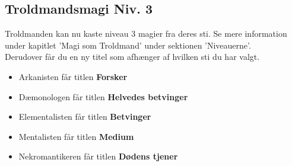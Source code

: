\subsection*{Troldmandsmagi Niv. 3}
Troldmanden kan nu kaste niveau 3 magier fra deres sti. Se mere information under kapitlet 'Magi som Troldmand' under sektionen 'Niveauerne'. \\
Derudover får du en ny titel som afhænger af hvilken sti du har valgt.\\
\begin{itemize}
    \item Arkanisten får titlen \textbf{Forsker}
    \item Dæmonologen får titlen \textbf{Helvedes betvinger}
    \item Elementalisten får titlen \textbf{Betvinger}
    \item Mentalisten får titlen \textbf{Medium}
    \item Nekromantikeren får titlen \textbf{Dødens tjener}
\end{itemize}